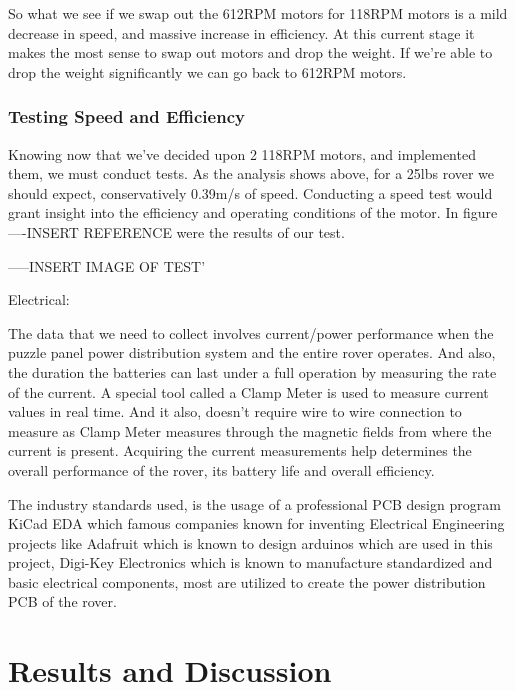 \documentclass[a4paper, 10pt]{article}
\begin{document}
		So what we see if we swap out the 612RPM motors for 118RPM motors is a mild decrease in speed, and massive increase in efficiency. At this current stage it makes the most sense to swap out motors and drop the weight. If we're able to drop the weight significantly we can go back to 612RPM motors. 
		
		\subsubsection*{Testing Speed and Efficiency}
		Knowing now that we've decided upon 2 118RPM motors, and implemented them, we must conduct tests. As the analysis shows above, for a 25lbs rover we should expect, conservatively 0.39m/s of speed. Conducting a speed test would grant insight into the efficiency and operating conditions of the motor. In figure ----INSERT REFERENCE were the results of our test.
		
		-----INSERT IMAGE OF TEST'
		
		
		
		





Electrical:

The data that we need to collect involves current/power performance when the puzzle panel power distribution system and the entire rover operates. And also, the duration the batteries can last under a full operation by measuring the rate of the current. A special tool called a Clamp Meter is used to measure current values in real time. And it also, doesn't require wire to wire connection to measure as Clamp Meter measures through the magnetic fields from where the current is present. Acquiring the current measurements help determines the overall performance of the rover, its battery life and overall efficiency.

The industry standards used, is the usage of a professional PCB design program KiCad EDA which famous companies known for inventing Electrical Engineering projects like Adafruit which is known to design arduinos which are used in this project, Digi-Key Electronics which is known to manufacture standardized and basic electrical components, most are utilized to create the power distribution PCB of the rover.

\section{Results and Discussion}
\end{document}
